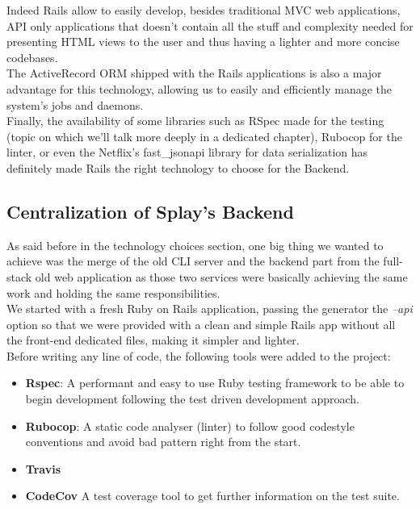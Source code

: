 \documentclass{eplmastersthesis}
\begin{document}
        Indeed Rails allow to easily develop, besides traditional MVC web
        applications, API only applications that doesn't contain all the stuff
        and complexity needed for presenting HTML views to the user and thus
        having a lighter and more concise codebases.\\
        The ActiveRecord \cite{activerecord} ORM shipped with the Rails
        applications is also a major advantage for this technology, allowing us
        to easily and efficiently manage the system's jobs and daemons.\\
        Finally, the availability of some libraries such as RSpec made for the
        testing (topic on which we'll talk more deeply in a dedicated chapter),
        Rubocop for the linter, or even the Netflix's fast\_jsonapi library for
        data serialization has definitely made Rails the right technology to
        choose for the Backend.

      \subsection{Centralization of Splay's Backend}

        As said before in the technology choices section, one big thing
        we wanted to achieve was the merge of the old CLI server and
        the backend part from the full-stack old web application as those two
        services were basically achieving the same work and holding the
        same responsibilities.\\

        We started with a fresh Ruby on Rails application, passing the
        generator the \textit{--api} option so that we were provided with
        a clean and simple Rails app without all the front-end dedicated
        files, making it simpler and lighter.\\

        Before writing any line of code, the following tools were added
        to the project:

        \begin{itemize}
          \item \textbf{Rspec}: A performant and easy to use Ruby testing
          framework to be able to begin development following the test
          driven development approach.
          \item \textbf{Rubocop}: A static code analyser (linter) to follow
          good codestyle conventions and avoid bad pattern right from the start.
          \item \textbf{Travis}
          \item \textbf{CodeCov} A test coverage tool to get further
          information on the test suite.
        \end{itemize}
\end{document}
